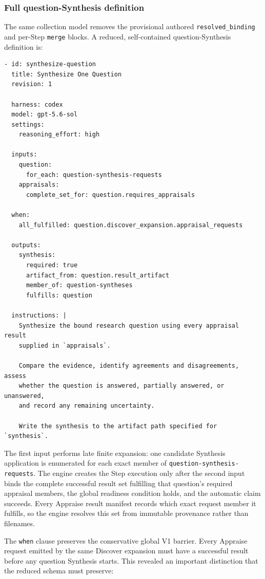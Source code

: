 \documentclass[11pt]{article}
\begin{document}
\Needspace{6.5in}
\subsubsection{Full question-Synthesis definition}

The same collection model removes the provisional authored
\texttt{resolved\_binding} and per-Step \texttt{merge} blocks. A reduced,
self-contained question-Synthesis definition is:

\begin{lstlisting}[style=playbook,basicstyle=\ttfamily\scriptsize]
- id: synthesize-question
  title: Synthesize One Question
  revision: 1

  harness: codex
  model: gpt-5.6-sol
  settings:
    reasoning_effort: high

  inputs:
    question:
      for_each: question-synthesis-requests
    appraisals:
      complete_set_for: question.requires_appraisals

  when:
    all_fulfilled: question.discover_expansion.appraisal_requests

  outputs:
    synthesis:
      required: true
      artifact_from: question.result_artifact
      member_of: question-syntheses
      fulfills: question

  instructions: |
    Synthesize the bound research question using every appraisal result
    supplied in `appraisals`.

    Compare the evidence, identify agreements and disagreements, assess
    whether the question is answered, partially answered, or unanswered,
    and record any remaining uncertainty.

    Write the synthesis to the artifact path specified for `synthesis`.
\end{lstlisting}

The first input performs late finite expansion: one candidate Synthesis
application is enumerated for each exact member of
\texttt{question-synthesis-requests}. The engine creates the Step execution
only after the second input binds the complete successful result set fulfilling
that question's required appraisal members, the global readiness condition
holds, and the automatic claim succeeds. Every Appraise result manifest records
which exact request member it fulfills, so the engine resolves this set from
immutable provenance rather than filenames.

The \texttt{when} clause preserves the conservative global V1 barrier. Every
Appraise request emitted by the same Discover expansion must have a successful
result before any question Synthesis starts. This revealed an important
distinction that the reduced schema must preserve:
\end{document}
